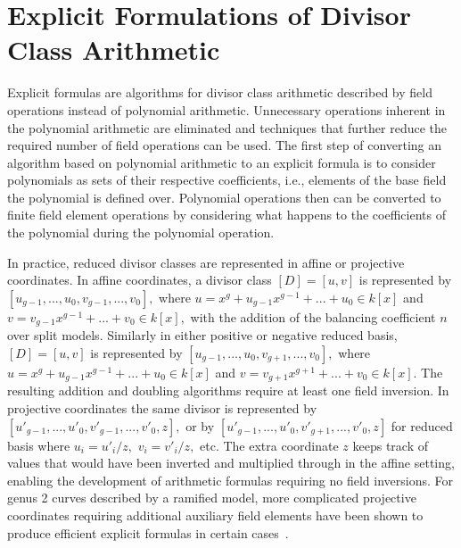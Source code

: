 \section{Explicit Formulations of Divisor Class Arithmetic}
\label{sec:explicit}
Explicit formulas are algorithms for divisor class arithmetic described by field
operations instead of polynomial arithmetic. Unnecessary operations inherent in
the polynomial arithmetic are eliminated and techniques that further reduce the required
number of field operations can be used. The first step of converting an
algorithm based on polynomial arithmetic to an explicit formula is to consider
polynomials as sets of their respective coefficients, i.e., elements of the base
field the polynomial is defined over. Polynomial operations then can be
converted to finite field element operations by considering what happens to the
coefficients of the polynomial during the polynomial operation.

In practice, reduced divisor classes are represented in affine or projective
coordinates. In affine coordinates, a divisor class $[D] = [u,v]$ is represented
by $[u_{g-1},...,u_0, v_{g-1},...,v_0],$ where $u = x^g + u_{g-1}x^{g-1} + ... +
u_0 \in k[x]$ and $v = v_{g-1}x^{g-1} + ... + v_0 \in k[x],$ with the addition
of the balancing coefficient $n$ over split models. Similarly in either positive
or negative reduced basis, $[D] = [u,v]$ is represented by $[u_{g-1},...,u_0,
v_{g+1},...,v_0],$ where $u = x^g + u_{g-1}x^{g-1} + ... + u_0 \in k[x]$ and $v
= v_{g+1}x^{g+1} + ... + v_0 \in k[x]$.  The resulting addition and doubling
algorithms require at least one field inversion. In projective coordinates the
same divisor is represented by $[u'_{g-1},...,u'_0, v'_{g-1},...,v'_0,z],$ or by
$[u'_{g-1},...,u'_0, v'_{g+1},...,v'_0,z]$ for reduced basis where $u_i =
u'_i/z,$ $v_i = v'_i/z,$ etc. The extra coordinate $z$ keeps track of values
that would have been inverted and multiplied through in the affine setting,
enabling the development of arithmetic formulas requiring no field inversions.
For genus 2 curves described by a ramified model, more complicated projective
coordinates requiring additional auxiliary field elements have been shown to
produce efficient explicit formulas in certain
cases~\cite{HisilCostello_jaccoord_2014}.


